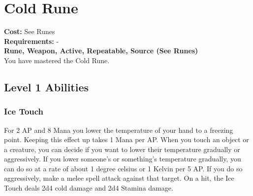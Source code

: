 \section{Cold Rune}\label{rune:cold}
\textbf{Cost:} See Runes\\
\textbf{Requirements:} -\\
\textbf{Rune, Weapon, Active, Repeatable, Source (See Runes)}\\
You have mastered the Cold Rune.

\subsection{Level 1 Abilities}

\subsubsection{Ice Touch}
For 2 AP and 8 Mana you lower the temperature of your hand to a freezing point.
Keeping this effect up takes 1 Mana per AP.
When you touch an object or a creature, you can decide if you want to lower their temperature gradually or aggressively.
If you lower someone's or something's temperature gradually, you can do so at a rate of about 1 degree celsius or 1 Kelvin per 5 AP.
If you do so aggressively, make a melee spell attack against that target.
On a hit, the Ice Touch deals 2d4 cold damage and 2d4 Stamina damage.